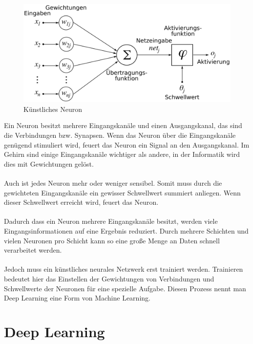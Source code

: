 \documentclass[12pt,oneside,a4paper,parskip]{scrbook}
\begin{document}
\begin{figure}[ht]
	\begin{center}
		\includegraphics[width=12cm]{Bilder/ArtificialNeuronModel_deutsch.png}
		\caption{Künstliches Neuron}
		\label{fig:wikiNeuron}
	\end{center}
\end{figure}
Ein Neuron besitzt mehrere Eingangskanäle und einen Ausgangskanal, das sind die Verbindungen bzw. Synapsen. Wenn das Neuron über die Eingangskanäle genügend stimuliert wird, feuert das Neuron ein Signal an den Ausgangskanal. Im Gehirn sind einige Eingangskanäle wichtiger als andere, in der Informatik wird dies mit Gewichtungen gelöst. 
\\\\
Auch ist jedes Neuron mehr oder weniger sensibel. Somit muss durch die gewichteten Eingangskanäle ein gewisser Schwellwert summiert anliegen. Wenn dieser Schwellwert erreicht wird, feuert das Neuron.
\\\\
Dadurch dass ein Neuron mehrere Eingangskanäle besitzt, werden viele Eingangsinformationen auf eine Ergebnis reduziert. Durch mehrere Schichten und vielen Neuronen pro Schicht kann so eine große Menge an Daten schnell verarbeitet werden. 
\\\\
Jedoch muss ein künstliches neurales Netzwerk erst trainiert werden. Trainieren bedeutet hier das Einstellen der Gewichtungen von Verbindungen und Schwellwerte der Neuronen für eine spezielle Aufgabe. Diesen Prozess nennt man Deep Learning eine Form von Machine Learning.

\section{Deep Learning}

\end{document}

